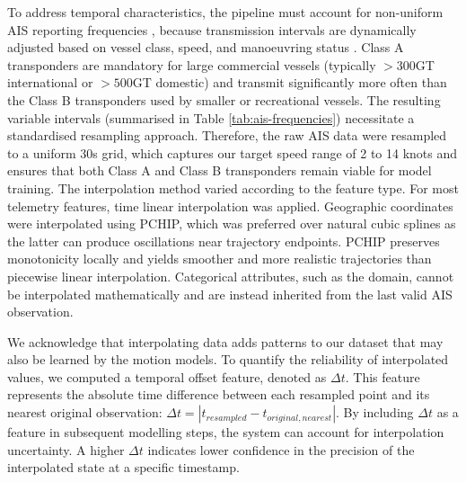 To address temporal characteristics, the pipeline must account for non-uniform \ac{AIS} reporting frequencies%
, because transmission intervals are dynamically adjusted based on vessel class, speed, and manoeuvring status %
\parencite{itu-r-m1371-1-2001}.
Class A transponders are mandatory for large commercial vessels (typically $>300$GT international or $>500$GT domestic) and transmit significantly more often than the Class B transponders used by smaller or recreational vessels. 
The resulting variable intervals (summarised in Table \ref{tab:ais-frequencies}) necessitate a standardised resampling approach. 
Therefore, the raw \ac{AIS} data were resampled to a uniform 30s grid, which captures our target speed range of 2 to 14 knots and ensures that both Class A and Class B transponders remain viable for model training. %
The interpolation method varied according to the feature type.
For most telemetry features, time linear interpolation was applied.
Geographic coordinates were interpolated using \ac{PCHIP}, which was preferred over natural cubic splines as the latter can produce oscillations near trajectory endpoints.
\ac{PCHIP} preserves monotonicity locally and yields smoother and more realistic trajectories than piecewise linear interpolation.
Categorical attributes, such as the domain, cannot be interpolated mathematically and are instead inherited from the last valid \ac{AIS} observation.%

We acknowledge that interpolating data adds patterns to our dataset that may also be learned by the motion models. 
To quantify the reliability of interpolated values, we computed a temporal offset feature, denoted as $\Delta t$.
This feature represents the absolute time difference between each resampled point and its nearest original observation:
$\Delta t = |t_{resampled} - t_{original, nearest}|$.
By including $\Delta t$ as a feature in subsequent modelling steps, the system can account for interpolation uncertainty.
A higher $\Delta t$ indicates lower confidence in the precision of the interpolated state at a 
specific timestamp.

